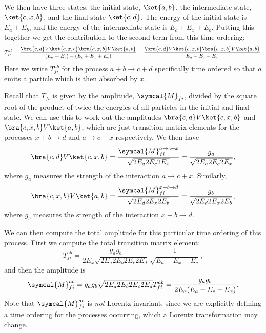 \documentclass[fleqn]{NotesClass}
\newcommand{\amplitude}{\symcal{M}}
\begin{document}
    We then have three states, the initial state, \(\ket{a, b}\), the intermediate state, \(\ket{c, x, b}\), and the final state \(\ket{c, d}\).
    The energy of the initial state is \(E_a + E_b\), and the energy of the intermediate state is \(E_c + E_x + E_b\).
    Putting this together we get the contribution to the second term from this time ordering:
    \begin{equation}
        T_{fi}^{ab} = \frac{\bra{c, d} V \ket{c, x, b} \bra{c, x, b} V \ket{a, b}}{(E_a + E_b) - (E_c + E_x + E_b)} = \frac{\bra{c, d} V \ket{c, x, b} \bra{c, x, b} V \ket{a, b}}{E_a - E_c - E_x}.
    \end{equation}
    Here we write \(T_{fi}^{ab}\) for the process \(a + b \to c + d\) specifically time ordered so that \(a\) emits a particle which is then absorbed by \(x\).
    
    Recall that \(T_{fi}\) is given by the amplitude, \(\amplitude_{fi}\), divided by the square root of the product of twice the energies of all particles in the initial and final state.
    We can use this to work out the amplitudes \(\bra{c, d} V \ket{c, x, b}\) and \(\bra{c, x, b} V \ket{a, b}\), which are just transition matrix elements for the processes \(x + b \to d\) and \(a \to c + x\) respectively.
    We then have
    \begin{equation}
        \bra{c, d} V \ket{c, x, b} = \frac{\amplitude_{fi}^{a \to c + x}}{\sqrt{2E_a2E_c2E_x}} = \frac{g_a}{\sqrt{2E_a2E_c2E_x}},
    \end{equation}
    where \(g_a\) measures the strength of the interaction \(a \to c + x\).
    Similarly,
    \begin{equation}
        \bra{c, x, b} V \ket{a, b} = \frac{\amplitude_{fi}^{x + b \to d}}{\sqrt{2E_d2E_x2E_b}} = \frac{g_b}{\sqrt{2E_d2E_x2E_b}},
    \end{equation}
    where \(g_b\) measures the strength of the interaction \(x + b \to d\).
    
    We can then compute the total amplitude for this particular time ordering of this process.
    First we compute the total transition matrix element:
    \begin{equation}
        T_{fi}^{ab} = \frac{g_ag_b}{2E_x\sqrt{2E_a2E_b2E_c2E_d}} \frac{1}{\sqrt{E_a - E_x - E_c}},
    \end{equation}
    and then the amplitude is
    \begin{equation}
        \amplitude_{fi}^{ab} = g_ag_b \sqrt{2E_a2E_b2E_c2E_d} T_{fi}^{ab} = \frac{g_ag_b}{2E_x(E_a - E_c - E_x)}.
    \end{equation}
    Note that \(\amplitude_{fi}^{ab}\) is \emph{not} Lorentz invariant, since we are explicitly defining a time ordering for the processes occurring, which a Lorentz transformation may change.
    
\end{document}

